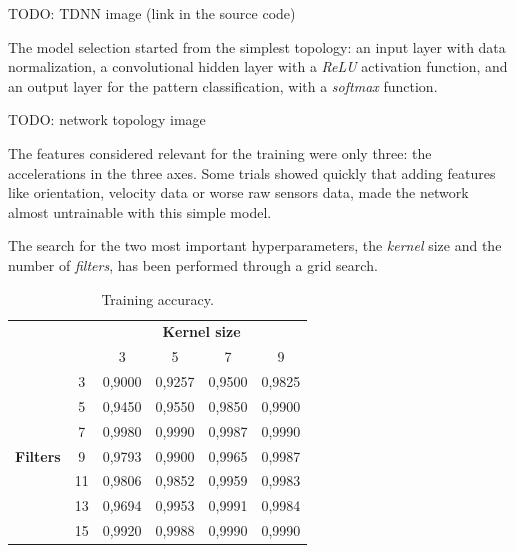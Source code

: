 TODO: TDNN image (link in the source code) %
\bigbreak

The model selection started from the simplest topology: an input layer with data normalization, a convolutional hidden layer with a \textit{ReLU} activation function, and an output layer for the pattern classification, with a \textit{softmax} function.
\bigbreak

TODO: network topology image
\bigbreak

The features considered relevant for the training were only three: the accelerations in the three axes. Some trials showed quickly that adding features like orientation, velocity data or worse raw sensors data, made the network almost untrainable with this simple model.
\bigbreak

The search for the two most important hyperparameters, the \textit{kernel} size and the number of \textit{filters}, has been performed through a grid search.

\begin{table}[ht]
	\centering
	\begin{tabular}{cccccc}
									  &                         & \multicolumn{4}{c}{\textbf{Kernel size}} \\
									  & \multicolumn{1}{c|}{}   & 3       & 5       & 7       & 9      \\ \cline{2-6} 
	\multirow{7}{*}{\textbf{Filters}} & \multicolumn{1}{c|}{3}  & 0,9000  & 0,9257  & 0,9500  & 0,9825 \\
									  & \multicolumn{1}{c|}{5}  & 0,9450  & 0,9550  & 0,9850  & 0,9900 \\
									  & \multicolumn{1}{c|}{7}  & 0,9980  & 0,9990  & 0,9987  & 0,9990 \\
									  & \multicolumn{1}{c|}{9}  & 0,9793  & 0,9900  & 0,9965  & 0,9987 \\
									  & \multicolumn{1}{c|}{11} & 0,9806  & 0,9852  & 0,9959  & 0,9983 \\
									  & \multicolumn{1}{c|}{13} & 0,9694  & 0,9953  & 0,9991  & 0,9984 \\
									  & \multicolumn{1}{c|}{15} & 0,9920  & 0,9988  & 0,9990  & 0,9990
	\end{tabular}
	\caption{Training accuracy.}
\end{table}

